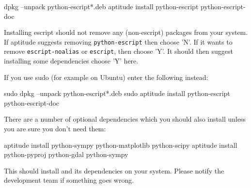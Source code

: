 \begin{shellCode}
dpkg --unpack python-escript*.deb
aptitude install python-escript python-escript-doc
\end{shellCode}

Installing escript should not remove any (non-escript) packages from your system.
If aptitude suggests removing \texttt{python-escript} then choose 'N'.
If it wants to remove \texttt{escript-noalias} or \texttt{escript}, then choose 'Y'.
It should then suggest installing some dependencies choose 'Y' here.

If you use sudo (for example on Ubuntu) enter the following instead:
\begin{shellCode}
sudo dpkg --unpack python-escript*.deb
sudo aptitude install python-escript python-escript-doc
\end{shellCode}

There are a number of optional dependencies which you should also install unless you are sure you don't need them:
\begin{shellCode}
aptitude install python-sympy python-matplotlib python-scipy 
aptitude install python-pyproj python-gdal python-sympy
\end{shellCode}



This should install \esfinley and its dependencies on your system.
Please notify the development team if something goes wrong.

